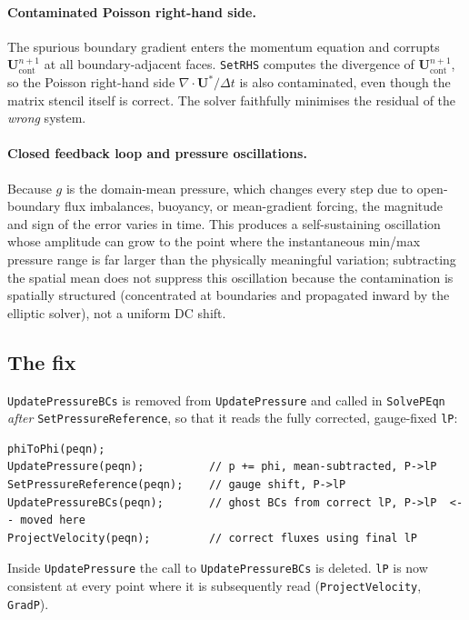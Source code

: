 \documentclass[12pt,a4paper]{article}
\begin{document}
\paragraph{Contaminated Poisson right-hand side.}
The spurious boundary gradient enters the momentum equation and
corrupts $\mathbf{U}^{n+1}_{\text{cont}}$ at all boundary-adjacent
faces.  \texttt{SetRHS} computes the divergence of
$\mathbf{U}^{n+1}_{\text{cont}}$, so the Poisson right-hand side
$\nabla \cdot \mathbf{U}^*/\Delta t$ is also contaminated, even though
the matrix stencil itself is correct.  The solver faithfully minimises
the residual of the \emph{wrong} system.

\paragraph{Closed feedback loop and pressure oscillations.}
Because $g$ is the domain-mean pressure, which changes every step due
to open-boundary flux imbalances, buoyancy, or mean-gradient forcing,
the magnitude and sign of the error varies in time.  This produces a
self-sustaining oscillation whose amplitude can grow to the point where
the instantaneous min/max pressure range is far larger than the
physically meaningful variation; subtracting the spatial mean does not
suppress this oscillation because the contamination is spatially
structured (concentrated at boundaries and propagated inward by the
elliptic solver), not a uniform DC shift.

\subsection{The fix}
\label{sec:peqn-bc-bug-fix}

\texttt{UpdatePressureBCs} is removed from \texttt{UpdatePressure} and
called in \texttt{SolvePEqn} \emph{after} \texttt{SetPressureReference},
so that it reads the fully corrected, gauge-fixed \texttt{lP}:

\begin{lstlisting}[caption={Corrected call order in \texttt{SolvePEqn}
  (\texttt{src/peqn.c}).},label=lst:peqn-fix]
phiToPhi(peqn);
UpdatePressure(peqn);          // p += phi, mean-subtracted, P->lP
SetPressureReference(peqn);    // gauge shift, P->lP
UpdatePressureBCs(peqn);       // ghost BCs from correct lP, P->lP  <-- moved here
ProjectVelocity(peqn);         // correct fluxes using final lP
\end{lstlisting}

Inside \texttt{UpdatePressure} the call to \texttt{UpdatePressureBCs}
is deleted.  \texttt{lP} is now consistent at every point where it is
subsequently read (\texttt{ProjectVelocity}, \texttt{GradP}).
\end{document}
